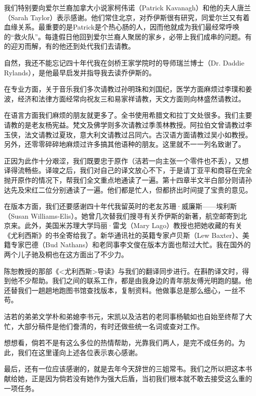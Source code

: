 \par 我们特别要向爱尔兰裔加拿大小说家柯伟诺（Patrick Kavanagh）和他的夫人唐兰（Sarah Taylor）表示感谢。他们常住北京，对乔伊斯很有研究，同爱尔兰又有着血缘关系。最重要的是Patrick是个热心肠的人，因而他就成为我们最经常呼唤的“救火队”。每逢假日他回到爱尔兰裔人聚居的家乡，必带上我们成串的问题。有的迎刃而解，有的他还到处代我们去请教。
\par 自然，我还不能忘记四十年代我在剑桥王家学院时的导师瑞兰博士（Dr. Daddie Rylands），是他最早启发并指导我去读乔伊斯的。
\par 在专业方面，关于音乐我们多次请教过孙明珠和刘国纪，医学方面麻烦过李璞和姜波，经济和法律方面经常向祝友三和易家祥请教，天文方面则向林盛然请教过。
\par 在语言方面我们麻烦的朋友就更多了。全书使用希腊文和拉丁文处很多。我们主要请教的是老友杨宪益。梵文及佛学则多次请教过季羡林教授。阿拉伯文曾请教过李玉侠，法文请教过夏玫，意大利文请教过吕同六。古汉语方面请教过吴小如教授。另外，还零零碎碎地麻烦过许多搞其他语种的朋友。这里就不一一列名致谢了。
\par 正因为此作十分艰涩，我们既要忠于原作（洁若一向主张一个零件也不丢），又想译得流畅些。译竣之后，我们对自己的译文放心不下，于是请丁亚平和商容在完全抛开原作的情况下，帮我们全文重点地通读了一遍。第十四章半文半白部分则请孙达先及宋红二位分别通读了一遍。他们都是忙人，但都挤出时间提了宝贵的意见。
\par 在版本方面，我们还要感谢四十年代我留英时的老友苏珊·威廉斯——埃利斯（Susan Williams-Elis）。她曾几次替我们搜寻有关乔伊斯的新著，航空邮寄到北京来。此外，美国米苏理大学玛丽·雷戈（Mary Lago）教授也把她收藏的有关《尤利西斯》的书全寄给我了。新华通讯社的英籍专家卢贝斯（Lew Baxter）、美籍专家巴德（Bud Nathans）和老同事李文俊在版本方面也帮过大忙。我在国外的两个儿子驰及桐也在这方面出了不少力。
\par 陈恕教授的那部《<尤利西斯>导读》与我们的翻译同步进行。在斟酌译文时，得到他不少帮助。我们之间的联系工作，都是由我身边的青年朋友傅光明跑的腿。他还替我们一趟趟地跑图书馆查找版本，复制资料。他做事总是那么细心，一丝不苟。
\par 洁若的弟弟文学朴和弟媳李书元，宋凯以及洁若的老同事杨毓如也自始至终帮了大忙，大部分稿件是他们誊清的，有时还做些统一名词或查对工作。
\par 想想看，倘若不是有这么多位的热情帮助，光靠我们两人，是完不成任务的。为此，我们在这里谨向上述各位表示衷心感谢。
\par 最后，还有一位应该感谢的，就是去年今天辞世的三姐常韦。我们之所以把这本书献给她，正是因为倘若没有她作为强大后盾，当初我们根本就不敢去接受这么重的一项任务。



